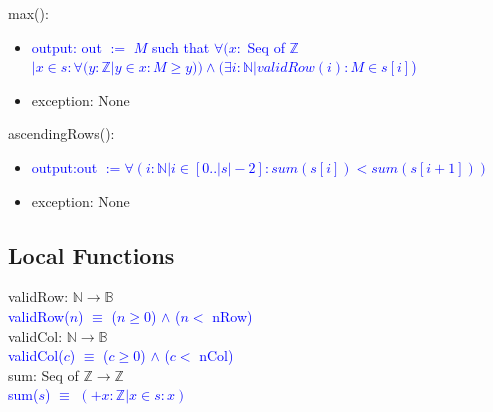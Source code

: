 \documentclass[12pt]{article}
\begin{document}
\noindent max():
\begin{itemize}
\item \textcolor{blue}{output: out $:=$ $M$ such that $\forall (x : $ Seq of $\mathbb{Z}$ $| x \in s : \forall (y : \mathbb{Z} | y \in x : M \geq y ))  \land (\exists i : \mathbb{N} | validRow(i) : M \in s[i] $)}
\item exception: None
\end{itemize}

\noindent ascendingRows():
\begin{itemize}
\item \textcolor{blue}{output:out $:= \forall (i : \mathbb{N} | i \in [0..|s|-2] : sum(s[i]) < sum(s[i+1])) $}
\item exception: None
\end{itemize}

\subsection*{Local Functions}

\noindent validRow: $\mathbb{N} \rightarrow \mathbb{B}$\\
\noindent \textcolor{blue}{validRow($n$) $\equiv$ ($n \geq 0$) $\land$ ($n < $ nRow)}\\

\noindent validCol: $\mathbb{N} \rightarrow \mathbb{B}$\\
\noindent \textcolor{blue}{validCol($c$) $\equiv$ ($c \geq 0$) $\land$ ($c < $ nCol)}\\
  
\noindent sum: Seq of $\mathbb{Z} \rightarrow \mathbb{Z}$\\
\noindent \textcolor{blue}{sum($s$) $\equiv$ $(+x : \mathbb{Z} | x \in s: x)$}

\newpage


  
\end{document}
